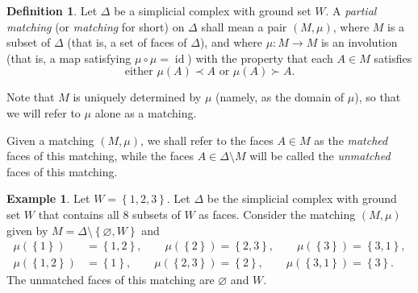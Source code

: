 \documentclass[12pt]{amsart}
\theoremstyle{definition}
\newtheorem{definition}[theorem]{Definition}
\newtheorem{example}[theorem]{Example}
\begin{document}
\begin{definition}
\label{def.parmat}
Let $\Delta$ be a simplicial complex with ground set $W$. A
\emph{partial matching} (or \emph{matching} for short) on $\Delta$ shall
mean a pair $\left(  M,\mu\right)  $, where $M$ is a subset of $\Delta$ (that
is, a set of faces of $\Delta$), and where $\mu:M\rightarrow M$ is an
involution (that is, a map satisfying $\mu\circ\mu=\operatorname*{id}$) with
the property that each $A\in M$ satisfies%
\[
\text{either }\mu\left(  A\right)  \prec A\text{ or }\mu\left(  A\right)
\succ A.
\]


Note that $M$ is uniquely determined by $\mu$ (namely, as the domain of $\mu
$), so that we will refer to $\mu$ alone as a matching.

Given a matching $\left(  M,\mu\right)  $, we shall refer to the faces $A\in M
$ as the \emph{matched} faces of this matching, while the faces $A\in
\Delta\setminus M$ will be called the \emph{unmatched} faces of this matching.
\end{definition}

\begin{example}
\label{exa.parmat.0}
Let $W=\left\{  1,2,3\right\}  $. Let $\Delta$ be the
simplicial complex with ground set $W$ that contains all $8$ subsets of $W$ as
faces. Consider the matching $\left(  M,\mu\right)  $ given by $M=\Delta
\setminus\left\{  \varnothing,W\right\}  $ and%
\begin{align*}
\mu\left(  \left\{  1\right\}  \right)   &  =\left\{  1,2\right\}  ,\qquad
\mu\left(  \left\{  2\right\}  \right)  =\left\{  2,3\right\}  ,\qquad
\mu\left(  \left\{  3\right\}  \right)  =\left\{  3,1\right\}  ,\\
\mu\left(  \left\{  1,2\right\}  \right)   &  =\left\{  1\right\}  ,\qquad
\mu\left(  \left\{  2,3\right\}  \right)  =\left\{  2\right\}  ,\qquad
\mu\left(  \left\{  3,1\right\}  \right)  =\left\{  3\right\}  .
\end{align*}
The unmatched faces of this matching are $\varnothing$ and $W$.
\end{example}
\end{document}
